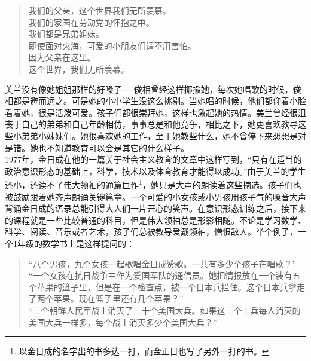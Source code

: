 \begin{quote}
	我们的父亲，这个世界我们无所羡慕。\\

	我们的家园在劳动党的怀抱之中。\\

	我们都是兄弟姐妹。\\

	即使面对火海，可爱的小朋友们请不用害怕。\\

	因为父亲在这里。\\

	这个世界，我们无所羡慕。\\
\end{quote}

美兰没有像她姐姐那样的好嗓子──俊相曾经这样揶揄她，每次她唱歌的时候，俊相都是避而远之。可是她的小小学生没这么挑剔。当她唱的时候，他们都仰着小脸看着她，很是活泼可爱。孩子们都很崇拜她，这样也激起她的热情。美兰曾经很沮丧于自己的弟弟和自己年龄相仿，事事总是和他竞争，相比之下，她更喜欢教导这些小弟弟小妹妹们。她很喜欢她的工作，至于她教些什么，她不曾停下来想想是对是错。她也不知道教育可以会是其它的什么样子。\\

1977年，金日成在他的一篇关于社会主义教育的文章中这样写到，“只有在适当的政治意识形态的基础上，科学，技术以及体育教育才能得以成功。”由于美兰的学生还小，还读不了伟大领袖的通篇巨作\footnote{以金日成的名字出的书多达一打，而金正日也写了另外一打的书。}，她只是大声的朗读着这些摘选。孩子们也被鼓励跟着她齐声朗诵关键篇章。一个可爱的小女孩或小男孩用孩子气的嗓音大声背诵金日成的语录总能引得大人们一片开心的笑声。在意识形态训练之后，接下来的课程就是一些比较普通的科目，但是伟大领袖总是形影相随。不论是学习数学、科学、阅读、音乐或者艺术，孩子们总被教导爱戴领袖，憎恨敌人。举个例子，一个1年级的数学书上是这样提问的：\\

\begin{quote}
	“八个男孩，九个女孩一起歌唱金日成赞歌。一共有多少个孩子在唱歌？”\\
	
	“一个女孩在抗日战争中作为爱国军队的通信员。她把情报放在一个装有五个苹果的篮子里，但是在一个检查点，被一个日本兵拦住。这个日本兵拿走了两个苹果。现在篮子里还有几个苹果？”\\

	“三个朝鲜人民军战士消灭了三十个美国大兵。如果这三个士兵每人消灭的美国大兵一样多，每个战士消灭多少个美国大兵？”\\
\end{quote}


